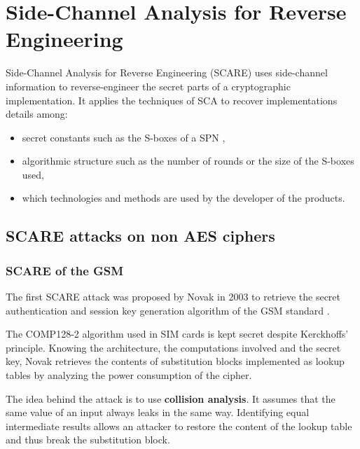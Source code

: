 \documentclass[11pt]{sdm}
\begin{document}



\section{Side-Channel Analysis for Reverse Engineering}

Side-Channel Analysis for Reverse Engineering (SCARE) uses side-channel information to reverse-engineer the secret parts of a cryptographic implementation.
It applies the techniques of SCA to recover implementations details among:
\begin{itemize}
    \item secret constants such as the S-boxes of a SPN \parencite{Novak_2003},
    \item algorithmic structure such as the number of rounds or the size of the S-boxes used,
    \item which technologies and methods are used by the developer of the products.
\end{itemize}

\subsection{SCARE attacks on non AES ciphers}
\label{scare_non_aes}

\subsubsection{SCARE of the GSM}
The first SCARE attack was proposed by Novak in 2003 to retrieve the secret authentication and session key generation algorithm of the GSM standard \parencite{Novak_2003}.

The COMP128-2 algorithm used in SIM cards is kept secret despite Kerckhoffs' principle.
Knowing the architecture, the computations involved and the secret key, Novak retrieves the contents of substitution blocks implemented as lookup tables by analyzing the power consumption of the cipher.

The idea behind the attack is to use \textbf{collision analysis}.
It assumes that the same value of an input always leaks in the same way.
Identifying equal intermediate results allows an attacker to restore the content of the lookup table and thus break the substitution block.
\end{document}
